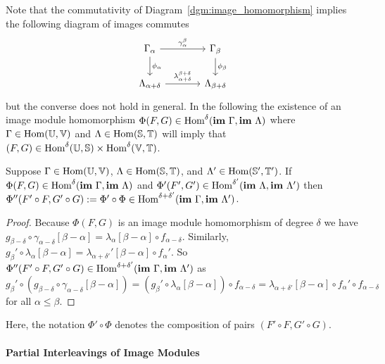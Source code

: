 Note that the commutativity of Diagram~\ref{dgm:image_homomorphism} implies the following diagram of images commutes
\begin{equation}
  \begin{tikzcd}[column sep=large]
    \Gamma_\alpha\arrow{r}{\gamma_\alpha^\beta}\arrow{d}{\phi_\alpha} &
    \Gamma_\beta\arrow{d}{\phi_\beta}\\
    \Lambda_{\alpha+\delta}\arrow{r}{\lambda_{\alpha+\delta}^{\beta+\delta}} &
    \Lambda_{\beta +\delta}
\end{tikzcd}\end{equation}
but the converse does not hold in general.
%
In the following the existence of an image module homomorphism $\Phi(F, G)\in\mathrm{Hom}^\delta(\mathbf{im}~\Gamma, \mathbf{im}~\Lambda)$ where $\Gamma\in\mathrm{Hom}(\mathbb{U},\mathbb{V})$ and $\Lambda\in\mathrm{Hom}(\mathbb{S},\mathbb{T})$  will imply that $(F,G)\in\mathrm{Hom}^\delta(\mathbb{U},\mathbb{S})\times \mathrm{Hom}^\delta(\mathbb{V},\mathbb{T})$.

\begin{lemma}\label{lem:image_composition}
  Suppose $\Gamma\in\mathrm{Hom}(\mathbb{U},\mathbb{V})$, $\Lambda\in\mathrm{Hom}(\mathbb{S},\mathbb{T})$, and $\Lambda'\in\mathrm{Hom}(\mathbb{S}',\mathbb{T}')$.
  If $\Phi(F, G)\in\mathrm{Hom}^\delta(\mathbf{im}~\Gamma, \mathbf{im}~\Lambda)$ and $\Phi'(F', G')\in\mathrm{Hom}^{\delta'}(\mathbf{im}~\Lambda, \mathbf{im}~\Lambda')$ then $\Phi''(F'\circ F, G'\circ G) := \Phi'\circ\Phi\in\mathrm{Hom}^{\delta+\delta'}(\mathbf{im}~\Gamma,\mathbf{im}~\Lambda')$.
\end{lemma}
\begin{proof}
  Because $\Phi(F, G)$ is an image module homomorphism of degree $\delta$ we have $g_{\beta-\delta}\circ\gamma_{\alpha-\delta}[\beta-\alpha] = \lambda_\alpha[\beta-\alpha]\circ f_{\alpha-\delta}$.
  Similarly, $g_{\beta}'\circ\lambda_{\alpha}[\beta-\alpha] = \lambda_{\alpha +\delta'}'[\beta-\alpha]\circ f_{\alpha}'$.
  So $\Phi''(F'\circ F, G'\circ G)\in\mathrm{Hom}^{\delta+\delta'}(\mathbf{im}~\Gamma,\mathbf{im}~\Lambda')$ as
  \[ g_\beta'\circ (g_{\beta-\delta}\circ \gamma_{\alpha-\delta}[\beta-\alpha]) = (g_\beta'\circ \lambda_\alpha[\beta-\alpha])\circ f_{\alpha-\delta} =\lambda_{\alpha+\delta'}[\beta-\alpha]\circ f_\alpha'\circ f_{\alpha-\delta}\]
  for all $\alpha\leq\beta$.
\end{proof}

Here, the notation $\Phi'\circ \Phi$ denotes the composition of pairs $(F'\circ F, G'\circ G)$.

\paragraph{Partial Interleavings of Image Modules}

